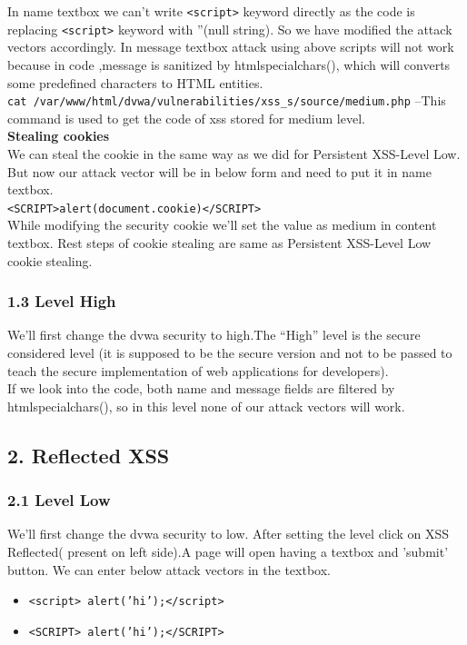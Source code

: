 \documentclass{article}
\begin{document}
In name textbox we can't write {\tt <script>} keyword directly as the code is replacing {\tt <script>} keyword with ''(null string). So we have modified the attack vectors accordingly.
In message textbox attack using above scripts will not work because in code ,message is sanitized by htmlspecialchars(), which will converts some predefined characters to HTML entities.\\
{\tt cat /var/www/html/dvwa/vulnerabilities/xss\_s/source/medium.php} --This command is used to get the code of xss stored for medium level.\\

\noindent \textbf{Stealing cookies}\\
We can steal the cookie in the same way as we did for Persistent XSS-Level Low. But now our attack vector will be in below form and need to put it in name textbox.\\
{\tt <SCRIPT>alert(document.cookie)</SCRIPT>}\\
While modifying  the security cookie we'll set the value as medium in content textbox. Rest steps of cookie stealing are same as Persistent XSS-Level Low cookie stealing.
\subsubsection*{1.3 Level High}
We'll first change the dvwa security to high.The “High” level is the secure considered level (it is supposed to be the secure version and not to be passed to teach the secure implementation of web applications for developers).\\
If we look into the code, both name and message fields are filtered by htmlspecialchars(), so in this level none of our attack vectors will work.

\subsection*{2. Reflected XSS}
\subsubsection*{2.1 Level Low}
We'll first change the dvwa security to low. After setting the level click on XSS Reflected( present on left side).A page will open having a textbox and 'submit' button. We can enter below attack vectors in the textbox.\\
\begin{itemize}
     \item {\tt <script> alert('hi');</script>}
     \item {\tt <SCRIPT> alert('hi');</SCRIPT>}
\end{itemize}
\end{document}
